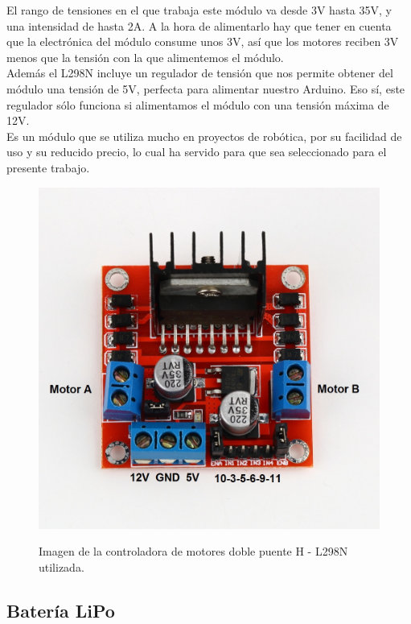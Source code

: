 El rango de tensiones en el que trabaja este módulo va desde 3V hasta 35V, y una intensidad de hasta 2A. A la hora de alimentarlo hay que tener en cuenta que la 
electrónica del módulo consume unos 3V, así que los motores reciben 3V menos que la tensión con la que alimentemos el módulo.\\

Además el L298N incluye un regulador de tensión que nos permite obtener del módulo una tensión de 5V, perfecta para alimentar nuestro Arduino. Eso sí, este regulador sólo 
funciona si alimentamos el módulo con una tensión máxima de 12V.\\

Es un módulo que se utiliza mucho en proyectos de robótica, por su facilidad de uso y su reducido precio, lo cual ha servido para que sea seleccionado para el presente trabajo.

\begin{figure}[H]
  \begin{center}
    \includegraphics[scale=0.8]{imagenes/l298n.jpg}\\
    \caption{ Imagen de la controladora de motores doble puente H - L298N utilizada.}
  \end{center}
\end{figure}

\subsection{ Batería LiPo }

